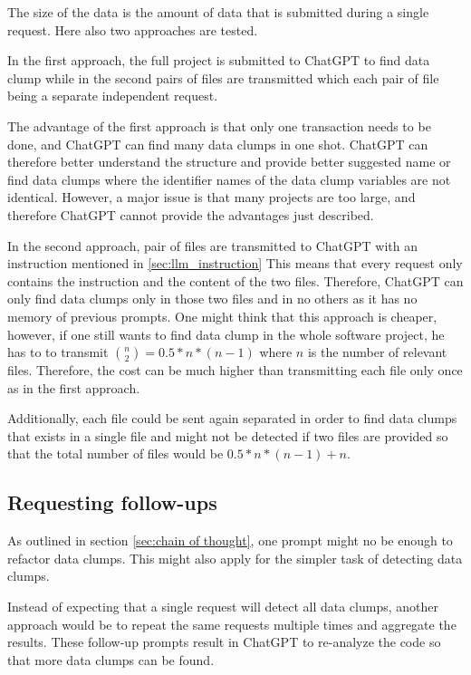 The size of the data is the amount of data that is submitted during a single request. Here also two approaches are tested.

In the first approach, the full project is submitted to ChatGPT to find data clump while in the second pairs of files are transmitted which each pair of file being a separate independent request.

The advantage of the first approach is that only one transaction needs to be done, and ChatGPT can find many data clumps in one shot. ChatGPT can therefore better understand the structure and provide better suggested name or find data clumps where the identifier names of the data clump variables are not identical. However,  a major issue is that many projects are too large, and therefore ChatGPT cannot provide the advantages just described.

In the second approach, pair of files are transmitted to ChatGPT with an instruction mentioned in \ref{sec:llm_instruction}
This means that every request only contains the instruction and the content of the two files. Therefore, ChatGPT can only find data clumps only in those two files and in no others as it has no memory of previous prompts. One might think that this approach is cheaper, however, if one still wants to find data clump in the whole software project, he has to to transmit $\binom{n}{2}=0.5*n*(n-1)$ where $n$ is the number of relevant files. Therefore, the cost can be much higher than transmitting each file only once as in the first approach.

Additionally, each file could be sent again separated in order to find data clumps that exists in a single file and might not be detected if two files are provided so that the total number of files would be $0.5*n*(n-1)+n$.


\subsection{Requesting follow-ups}

As outlined in section \ref{sec:chain of thought},  one prompt might no be enough to refactor data clumps. This might also apply for the simpler task of detecting data clumps.

Instead of expecting that a single request will detect all data clumps, another approach would be to repeat the same requests multiple times and aggregate the results. These follow-up prompts result in ChatGPT to re-analyze the code so that more data clumps can be found. 

